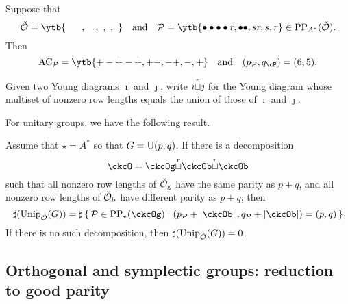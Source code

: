 \documentclass[counting_main.tex]{subfiles}
\begin{document}
\begin{eg}
 Suppose that \[
\check \CO=\ytb{\ \ \ \ \ , \ \ \ , \ , \ , \   }\quad \textrm{and}\quad  \CP=\ytb{\bullet\bullet\bullet\bullet r,\bullet\bullet , sr,s,r}\in \mathrm{PP}_{A^*}(\check \CO) .
 \]
 Then
 \[
  \mathrm{AC}_\CP=
 \ytb{+-+-+,+-, -+,-,+}\quad \textrm{and}  \quad  (p_\CP, q_\cP)=(6,5).
  \]
\end{eg}

Given two Young diagrams $\imath$ and $\jmath$, write $\imath{\stackrel{r}{\sqcup}} \jmath$ for
the Young diagram whose multiset of nonzero row lengths equals the union of
those of $\imath$ and $\jmath$.

For unitary groups, we have the following result.
\begin{thm}
  Assume that $\star=A^*$ so that $G=\operatorname{U}(p,q)$. If there is a decomposition
  \[
    \ckcO=\ckcOg \cuprow \ckcOb \cuprow \ckcOb
  \]
  such that all nonzero row lengths of $\check {{\mathcal {O}}}_{\mathrm g}$ have the same
  parity as $p+q$, and all nonzero row lengths of $\check {{\mathcal {O}}}_{\mathrm b}$ have
  different parity as $p+q$, then
  \[
    \sharp(\Unip_{\check \CO}(G))= \sharp\set{\CP\in \mathrm{PP}_\star(\ckcOg)|(p_\CP+\abs{\ckcOb}, q_\CP+\abs{\ckcOb})=(p,q)}
  \]
  If there is no such decomposition, then $\sharp(\mathrm{Unip}_{\check {{\mathcal {O}}}}(G))=0$.

\end{thm}

\subsection{Orthogonal and symplectic groups: reduction to good parity}
\end{document}

